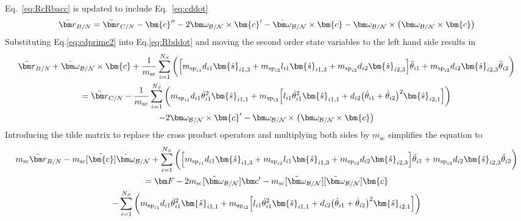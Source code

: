 Eq.~\eqref{eq:RcRbacc} is updated to include Eq.~\eqref{eq:cddot}
\begin{equation}
	\ddot{\bm r}_{B/N} = \ddot{\bm r}_{C/N}-\bm{c}'' - 2\bm\omega_{\cal B/N}\times\bm{c}'-\dot{\bm\omega}_{\cal B/N}\times\bm{c}-\bm\omega_{\cal B/N}\times\left(\bm\omega_{\cal B/N}\times\bm{c}\right)
	\label{eq:Rbddot}
\end{equation}
Substituting Eq.\eqref{eq:cdprime2} into Eq.\eqref{eq:Rbddot} and moving the second order state variables to the left hand side results in
\begin{multline}
	\ddot{\bm r}_{B/N} + \dot{\bm\omega}_{\cal B/N}\times\bm{c} +  \frac{1}{m_{\text{sc}}}\sum_{i=1}^{N_{S}}\bigg(\Big[m_{\text{sp}_{i1}}d_{i1} \bm{\hat{s}}_{i1,3} +m_{\text{sp}_{i2}}l_{i1} \bm{\hat{s}}_{i1,3}+m_{\text{sp}_{i2}} d_{i2}\bm{\hat{s}}_{i2,3}\Big]\ddot{\theta}_{i1} +m_{\text{sp}_{i2}} d_{i2} \bm{\hat{s}}_{i2,3}\ddot{\theta}_{i2}\bigg) \\
	= \ddot{\bm r}_{C/N}-\frac{1}{m_{\text{sc}}}\sum_{i=1}^{N_{S}}\bigg(m_{\text{sp}_{i1}}d_{i1} \dot{\theta}_{i1}^2 \bm{\hat{s}}_{i1,1} +m_{\text{sp}_{i2}}\Big[l_{i1} \dot{\theta}_{i1}^2 \bm{\hat{s}}_{i1,1} + d_{i2}\big(\dot{\theta}_{i1} + \dot{\theta}_{i2}\big)^2\bm{\hat{s}}_{i2,1}\Big]\bigg) \\
	- 2\bm\omega_{\cal B/N}\times\bm{c}'-\bm\omega_{\cal B/N}\times\left(\bm\omega_{\cal B/N}\times\bm{c}\right)
	\label{eq:Rbddot2}
\end{multline}
Introducing the tilde matrix\cite{schaub} to replace the cross product operators and multiplying both sides by $m_\text{sc}$ simplifies the equation to
\begin{multline}
	m_\text{sc} \ddot{\bm r}_{B/N} -m_\text{sc} [\tilde{\bm{c}}] \dot{\bm\omega}_{\cal B/N} +  \sum_{i=1}^{N_{S}}\bigg(\Big[m_{\text{sp}_{i1}}d_{i1} \bm{\hat{s}}_{i1,3} +m_{\text{sp}_{i2}}l_{i1} \bm{\hat{s}}_{i1,3}+m_{\text{sp}_{i2}} d_{i2}\bm{\hat{s}}_{i2,3}\Big]\ddot{\theta}_{i1} +m_{\text{sp}_{i2}} d_{i2} \bm{\hat{s}}_{i2,3}\ddot{\theta}_{i2}\bigg) \\
	= \bm F - 2m_\text{sc} [\tilde{\bm\omega}_{\cal B/N}] \bm c'- m_\text{sc} [\tilde{\bm\omega}_{\cal B/N}][\tilde{\bm\omega}_{\cal B/N}]\bm{c}\\
	-\sum_{i=1}^{N_{S}}\bigg(m_{\text{sp}_{i1}}d_{i1} \dot{\theta}_{i1}^2 \bm{\hat{s}}_{i1,1} +m_{\text{sp}_{i2}}\Big[l_{i1} \dot{\theta}_{i1}^2 \bm{\hat{s}}_{i1,1} + d_{i2}\big(\dot{\theta}_{i1} + \dot{\theta}_{i2}\big)^2\bm{\hat{s}}_{i2,1}\Big]\bigg)
	\label{eq:Rbddot3}
\end{multline}

